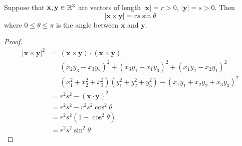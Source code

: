 \documentclass[10pt, a4paper]{article}
\newcommand{\mbf}[1]{\mathbf{#1}}
\begin{document}
\begin{lemma}
    Suppose that $\mbf{x, y} \in \R ^ 3$ are vectors of length $|\mbf{x}| = r > 0$, $|\mbf{y}| = s > 0$. Then
    \[
    |\mbf{x \times y}| = rs\sin\theta
    \]
    where $0 \leq \theta \leq \pi$ is the angle between $\mbf{x}$ and $\mbf{y}$.
    
    \begin{proof}
        \begin{align*}
            |\mbf{x\times y}| ^ 2 &= (\mbf{x} \times \mbf{y}) \cdot (\mbf{x} \times \mbf{y}) \\
            &= (x_2y_3 - x_3y_2) ^ 2 + (x_3y_1 - x_1y_3) ^ 2 + (x_1y_2 - x_2y_1) ^ 2 \\
            &= (x_1 ^ 2 + x_2 ^ 2 + x_3 ^ 2)(y_1 ^ 2 + y_2 ^ 2 + y_3 ^ 2) - (x_1y_1 + x_2y_2 + x_3y_3) ^ 2 \\
            &= r ^ 2 s ^ 2 - (\mbf{x \cdot y}) ^ 2 \\
            &= r ^ 2 s ^ 2 - r ^ 2 s ^ 2 \cos ^ 2\theta \\ 
            &= r ^ 2 s ^ 2 (1 - \cos ^ 2\theta) \\ 
            &= r ^ 2 s ^ 2 \sin ^ 2 \theta 
        \end{align*}
    \end{proof}
\end{lemma}
\end{document}
